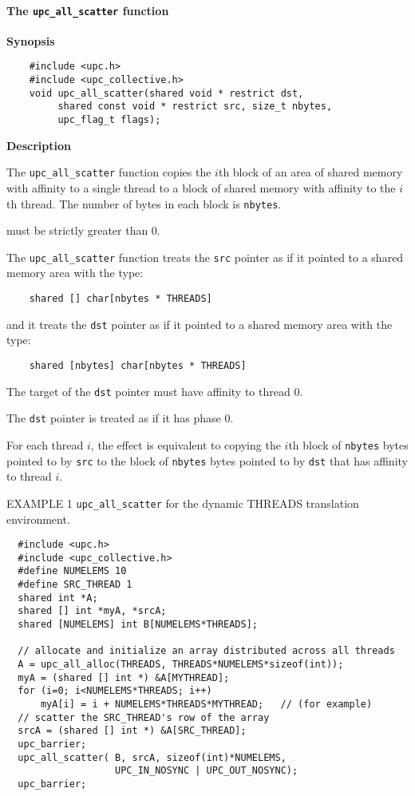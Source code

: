 \paragraph{The {\tt upc\_all\_scatter} function}

{\bf Synopsis} 

\npf\vspace{-2.5em}
\begin{verbatim}
    #include <upc.h>
    #include <upc_collective.h>
    void upc_all_scatter(shared void * restrict dst, 
         shared const void * restrict src, size_t nbytes, 
         upc_flag_t flags);
\end{verbatim}

{\bf Description} 

\np The {\tt upc\_all\_scatter} function copies the $i$th block of an
area of shared memory with affinity to a single thread
to a block of shared memory with affinity to the $i$th thread.
The number of bytes in each block is {\tt nbytes}.

 must be strictly greater than 0.

\np The {\tt upc\_all\_scatter} function treats the {\tt src} pointer
as if it pointed to a shared memory area with the type:

\begin{verbatim}
    shared [] char[nbytes * THREADS]
\end{verbatim}  

\np and it treats the {\tt dst} pointer as if it pointed to a shared
memory area with the type:

\begin{verbatim}
    shared [nbytes] char[nbytes * THREADS]
\end{verbatim}  

\np The target of the {\tt dst} pointer must have affinity to thread 0.

\np The {\tt dst} pointer is treated as if it has phase 0.

\np For each thread $i$, the effect is equivalent to copying
the $i$th block of {\tt nbytes} bytes pointed to by {\tt src} to
the block of {\tt nbytes} bytes 
pointed to by {\tt dst} that has affinity to thread $i$.

\np EXAMPLE 1 {\tt upc\_all\_scatter} for the {dynamic THREADS} translation
environment.

\begin{verbatim}
  #include <upc.h>
  #include <upc_collective.h>
  #define NUMELEMS 10
  #define SRC_THREAD 1
  shared int *A;
  shared [] int *myA, *srcA;
  shared [NUMELEMS] int B[NUMELEMS*THREADS];

  // allocate and initialize an array distributed across all threads
  A = upc_all_alloc(THREADS, THREADS*NUMELEMS*sizeof(int));
  myA = (shared [] int *) &A[MYTHREAD];
  for (i=0; i<NUMELEMS*THREADS; i++)
      myA[i] = i + NUMELEMS*THREADS*MYTHREAD;   // (for example)
  // scatter the SRC_THREAD's row of the array
  srcA = (shared [] int *) &A[SRC_THREAD];
  upc_barrier;
  upc_all_scatter( B, srcA, sizeof(int)*NUMELEMS,
                   UPC_IN_NOSYNC | UPC_OUT_NOSYNC);
  upc_barrier;
\end{verbatim}

